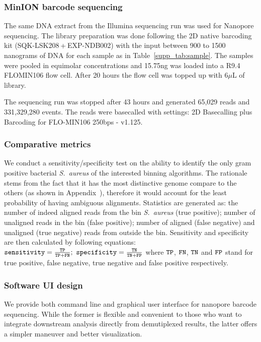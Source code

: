 \subsubsection{MinION barcode sequencing}
The same DNA extract from the Illumina sequencing run was used for Nanopore sequencing. The library preparation was done following the 2D native barcoding kit (SQK-LSK208 + EXP-NDB002) with the input between 900 to 1500 nanograms of DNA for each sample as in Table~\ref{supp_tab:sample}. 
The samples were pooled in equimolar concentrations and 15.75ng was loaded into a R9.4 FLOMIN106 flow cell. After 20 hours the flow cell was topped up with 6$\mu$L of library.

The sequencing run was stopped after 43 hours and generated 65,029 reads and 331,329,280 events. The reads were basecalled with settings: 2D Basecalling plus Barcoding for FLO-MIN106 250bps - v1.125.
\subsubsection{Comparative metrics}
We conduct a sensitivity/specificity test on the ability to identify the only gram positive bacterial \emph{S.~aureus} of the interested binning algorithms. The rationale stems from the fact that it has the most distinctive genome compare to the others (as shown in Appendix~), therefore it would account for the least probability of having ambiguous alignments. Statistics are generated as: the number of indeed aligned reads from the bin \emph{S.~aureus} (true positive); number of unaligned reads in the bin (false positive); number of aligned (false negative) and unaligned (true negative) reads from outside the bin. Sensitivity and specificity are then calculated by following equations:
$
	\mathtt{sensitivity} = \frac{\mathtt{TP}}{\mathtt{TP+FN}} ;~
    \mathtt{specificity} = \frac{\mathtt{TN}}{\mathtt{TN+FP}}
$
where $\mathtt{TP}$, $\mathtt{FN}$, $\mathtt{TN}$ and $\mathtt{FP}$ stand for true positive, false negative, true negative and false positive respectively.

\subsubsection{Software UI design}
We provide both command line and graphical user interface for nanopore barcode sequencing. While the former is flexible and convenient to those who want to integrate downstream analysis directly from demutiplexed results, the latter offers a simpler maneuver and better visualization.

